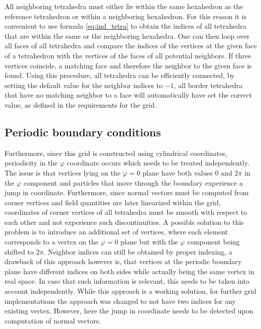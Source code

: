 \documentclass[./main.tex]{subfiles}
\begin{document}
All neighboring tetrahedra must either lie within the same hexahedron as the reference tetrahedron or within a neighboring hexahedron. For this reason it is convenient to use formula \ref{eq:ind_tetra} to obtain the indices of all tetrahedra that are within the same or the neighboring hexahedra. One can then loop over all faces of all tetrahedra and compare the indices of the vertices at the given face of a tetrahedron with the vertices of the faces of all potential neighbors. If three vertices coincide, a matching face and therefore the neighbor to the given face is found. Using this procedure, all tetrahedra can be efficiently connected, by setting the default value for the neighbor indices to $-1$, all border tetrahedra that have no matching neighbor to a face will automatically have set the correct value, as defined in the requirements for the grid.
\subsection{Periodic boundary conditions}
Furthermore, since this grid is constructed using cylindrical coordinates, periodicity in the $\varphi$ coordinate occurs which needs to be treated independently. The issue is that vertices lying on the $\varphi = 0$ plane have both values $0$ and $2\pi$ in the $\varphi$ component and particles that move through the boundary experience a jump in coordinate. Furthermore, since normal vectors must be computed from corner vertices and field quantities are later linearized within the grid, coordinates of corner vertices of all tetrahedra must be smooth with respect to each other and not experience such discontinuities. A possible solution to this problem is to introduce an additional set of vertices, where each element corresponds to a vertex on the $\varphi= 0$ plane but with the $\varphi$ component being shifted to $2\pi$. Neighbor indices can still be obtained by proper indexing, a drawback of this approach however is, that vertices at the periodic boundary plane have different indices on both sides while actually being the same vertex in real space. In case that such information is relevant, this needs to be taken into account independently. While this approach is a working solution, for further grid implementations the approach was changed to not have two indices for any existing vertex. However, here the jump in coordinate needs to be detected upon computation of normal vectors.  
\end{document}
